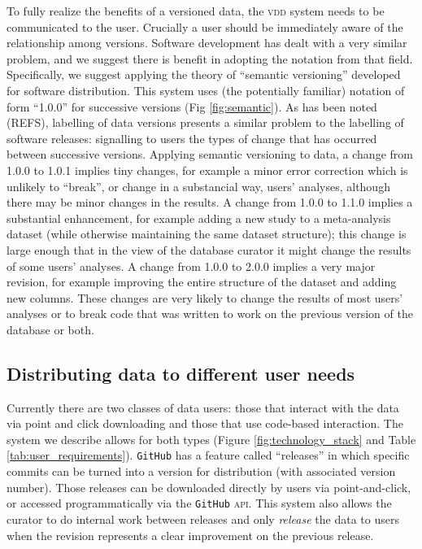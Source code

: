 \documentclass[a4paper,11pt]{article}
\begin{document}
To fully realize the benefits of a versioned data, the \textsc{vdd} system needs to be communicated to the user.  Crucially a user should be immediately aware of the relationship among versions.  Software development has dealt with a very similar problem, and we suggest there is benefit in adopting the notation from that field.  Specifically, we suggest applying the theory of ``semantic versioning'' developed for software distribution. This system uses (the potentially familiar) notation of form ``1.0.0'' for successive versions (Fig \ref{fig:semantic}). As has been noted (REFS), labelling of data versions presents a similar problem to the labelling of software releases: signalling to users the types of change that has occurred between successive versions. Applying semantic versioning to data, a change from 1.0.0 to 1.0.1 implies tiny changes, for example a minor error correction which is unlikely to ``break'', or change in a substancial way, users' analyses, although there may be minor changes in the results. A change from 1.0.0 to 1.1.0 implies a substantial enhancement, for example adding a new study to a meta-analysis dataset (while otherwise maintaining the same dataset structure); this change is large enough that in the view of the database curator it might change the results of some users' analyses. A change from 1.0.0 to 2.0.0 implies a very major revision, for example improving the entire structure of the dataset and adding new columns. These changes are very likely to change the results of most users' analyses or to break code that was written to work on the previous version of the database or both.  


\subsection{Distributing data to different user needs}

Currently there are two classes of data users: those that  interact with the data via point and click downloading and those that use code-based interaction.  The system we describe allows for both types (Figure \ref{fig:technology_stack} and Table \ref{tab:user_requirements}).  \texttt{GitHub} has a feature called ``releases'' in which specific commits can be turned into a version for distribution (with associated version number).  Those releases can be downloaded directly by users via point-and-click, or accessed programmatically via the \texttt{GitHub} \textsc{api}.  This system also allows the curator to do internal work between releases and only \emph{release} the data to users when the revision represents a clear improvement on the previous release.  
\end{document}

